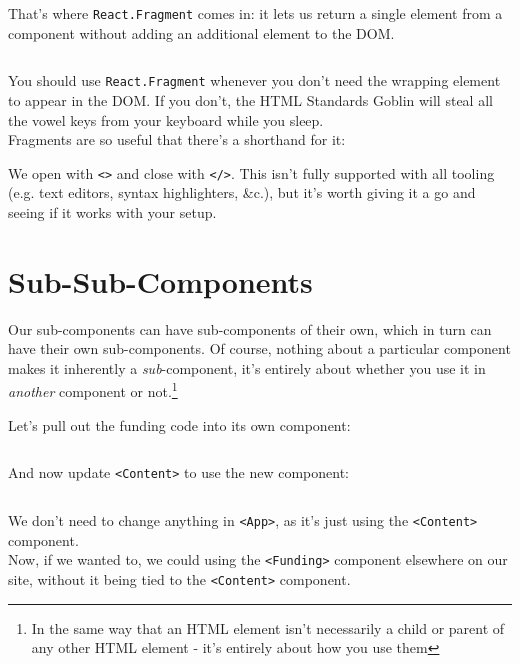 That's where \texttt{React.Fragment} comes in: it lets us return a single element from a component without adding an additional element to the DOM.

\inputminted{jsx}{02-jsx/figures/09-React.Fragment.jsx}

You should use \texttt{React.Fragment} whenever you don't need the wrapping element to appear in the DOM. If you don't, the HTML Standards Goblin will steal all the vowel keys from your keyboard while you sleep.
\\

Fragments are so useful that there's a shorthand for it:


We open with \texttt{<>} and close with \texttt{</>}. This isn't fully supported with all tooling (e.g. text editors, syntax highlighters, \&c.), but it's worth giving it a go and seeing if it works with your setup.



\section{Sub-Sub-Components}

Our sub-components can have sub-components of their own, which in turn can have their own sub-components. Of course, nothing about a particular component makes it inherently a \textit{sub}-component, it's entirely about whether you use it in \textit{another} component or not.\footnote{In the same way that an HTML element isn't necessarily a child or parent of any other HTML element - it's entirely about how you use them}


\pagebreak


Let's pull out the funding code into its own component:

\inputminted{jsx}{02-jsx/figures/11-Funding.jsx}

And now update \texttt{<Content>} to use the new component:

\inputminted{jsx}{02-jsx/figures/12-Content-with-Funding.jsx}

We don't need to change anything in \texttt{<App>}, as it's just using the \texttt{<Content>} component.
\\

Now, if we wanted to, we could using the \texttt{<Funding>} component elsewhere on our site, without it being tied to the \texttt{<Content>} component.


